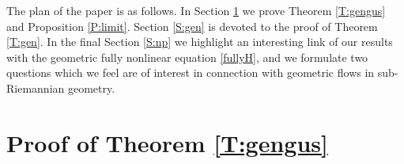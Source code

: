 \documentclass[11pt,a4paper]{amsart}
\numberwithin{equation}{section}
\numberwithin{equation}{section}
\begin{document}
The plan of the paper is as follows. In Section \ref{S:meh} we prove Theorem \ref{T:gengus} and Proposition \ref{P:limit}. Section \ref{S:gen} is devoted to the proof of Theorem \ref{T:gen}. In the final Section \ref{S:np} we highlight an interesting link of our results with the geometric fully nonlinear equation \eqref{fullyH}, and we formulate two questions which we feel are of interest in connection with geometric flows in sub-Riemannian geometry.


  


\section{Proof of Theorem \ref{T:gengus}}\label{S:meh}
\end{document}
